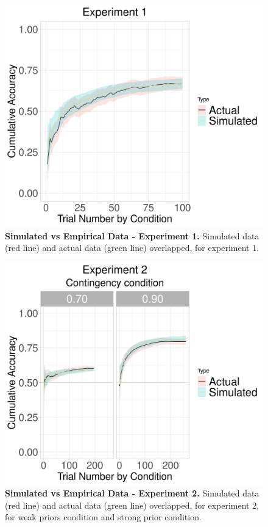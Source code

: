 \documentclass[a4paper,12pt]{article}
\begin{document}
\begin{figure}[ht!]
\centerline
{\includegraphics[width=1\textwidth]{figures/SimulatedVsActual.exp=exp1.mod=fLR_Instr.png}}
\caption{\textbf{Simulated vs Empirical Data - Experiment 1.} Simulated data (red line) and actual data (green line) overlapped, for experiment 1.}
\label{fig:simvsemp_Exp1}
\end{figure}

\begin{figure}[ht!]
\centerline
{\includegraphics[width=1.5\textwidth]{figures/SimulatedVsActual.exp=exp2.mod=fLR_Instr.png}}
\caption{\textbf{Simulated vs Empirical Data - Experiment 2.} Simulated data (red line) and actual data (green line) overlapped, for experiment 2, for weak priors condition and strong prior condition. }
\label{fig:simvsemp_Exp2}
\end{figure}
\end{document}
